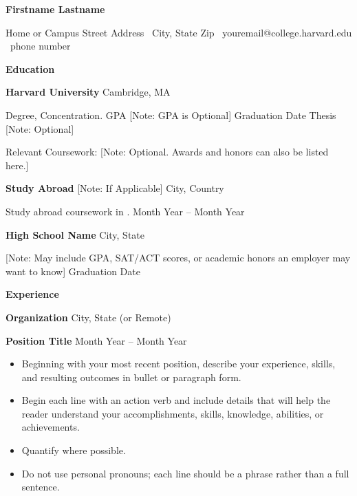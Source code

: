 \documentclass[11pt]{article}
\begin{document}
\begin{center}
    \textbf{Firstname Lastname}\\ 
    \hrulefill
\end{center}

\begin{center}
    Home or Campus Street Address \textbullet \ City, State Zip \textbullet \ youremail@college.harvard.edu \textbullet \ phone number
\end{center}

\vspace{0.5pt}

\begin{center}
    \textbf{Education}
\end{center}
\textbf{Harvard University} \hfill Cambridge, MA

Degree, Concentration. GPA [Note: GPA is Optional] \hfill Graduation Date Thesis [Note: Optional]

Relevant Coursework: [Note: Optional. Awards and honors can also be listed here.]

\vspace{12pt}

\textbf{Study Abroad} [Note: If Applicable] \hfill City, Country

Study abroad coursework in   . \hfill	Month Year – Month Year

\vspace{12pt}

\textbf{High School Name} \hfill	City, State

[Note: May include GPA, SAT/ACT scores, or academic honors an employer may want to know] \hfill Graduation Date

\vspace{12pt}

\begin{center}
    \textbf{Experience}
\end{center}
\textbf{Organization} \hfill City, State (or Remote)

\textbf{Position Title} \hfill Month Year – Month Year
\begin{itemize}[noitemsep, topsep=0pt, partopsep=0pt, parsep=0pt]
    \item Beginning with your most recent position, describe your experience, skills, and resulting outcomes in bullet or paragraph form.
    \item Begin each line with an action verb and include details that will help the reader understand your accomplishments, skills, knowledge, abilities, or achievements.
    \item Quantify where possible.
    \item Do not use personal pronouns; each line should be a phrase rather than a full sentence.
\end{itemize}
\end{document}

